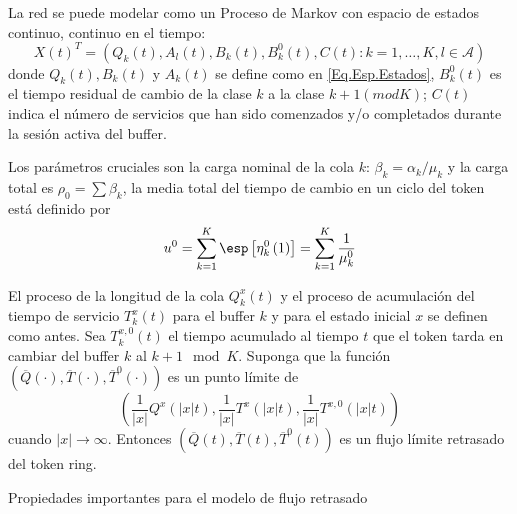La red se puede modelar como un Proceso de Markov con espacio de
estados continuo, continuo en el tiempo:
\begin{equation}
 X\left(t\right)^{T}=\left(Q_{k}\left(t\right),A_{l}\left(t\right),B_{k}\left(t\right),B_{k}^{0}\left(t\right),C\left(t\right):k=1,\ldots,K,l\in\mathcal{A}\right)
\end{equation}
donde $Q_{k}\left(t\right), B_{k}\left(t\right)$ y
$A_{k}\left(t\right)$ se define como en \ref{Eq.Esp.Estados},
$B_{k}^{0}\left(t\right)$ es el tiempo residual de cambio de la
clase $k$ a la clase $k+1\left(mod K\right)$; $C\left(t\right)$
indica el n\'umero de servicios que han sido comenzados y/o
completados durante la sesi\'on activa del buffer.

Los par\'ametros cruciales son la carga nominal de la cola $k$:
$\beta_{k}=\alpha_{k}/\mu_{k}$ y la carga total es
$\rho_{0}=\sum\beta_{k}$, la media total del tiempo de cambio en
un ciclo del token est\'a definido por
\begin{equation}
 u^{0}=\sum_{k=1}^{K}\esp\left[\eta_{k}^{0}\left(1\right)\right]=\sum_{k=1}^{K}\frac{1}{\mu_{k}^{0}}
\end{equation}

El proceso de la longitud de la cola $Q_{k}^{x}\left(t\right)$ y
el proceso de acumulaci\'on del tiempo de servicio
$T_{k}^{x}\left(t\right)$ para el buffer $k$ y para el estado
inicial $x$ se definen como antes. Sea $T_{k}^{x,0}\left(t\right)$
el tiempo acumulado al tiempo $t$ que el token tarda en cambiar
del buffer $k$ al $k+1\mod K$. Suponga que la funci\'on
$\left(\overline{Q}\left(\cdot\right),\overline{T}\left(\cdot\right),\overline{T}^{0}\left(\cdot\right)\right)$
es un punto l\'imite de
\begin{equation}\label{Eq.4.4}
\left(\frac{1}{|x|}Q^{x}\left(|x|t\right),\frac{1}{|x|}T^{x}\left(|x|t\right),\frac{1}{|x|}T^{x,0}\left(|x|t\right)\right)
\end{equation}
cuando $|x|\rightarrow\infty$. Entonces
$\left(\overline{Q}\left(t\right),\overline{T}\left(t\right),\overline{T}^{0}\left(t\right)\right)$
es un flujo l\'imite retrasado del token ring.

Propiedades importantes para el modelo de flujo retrasado

